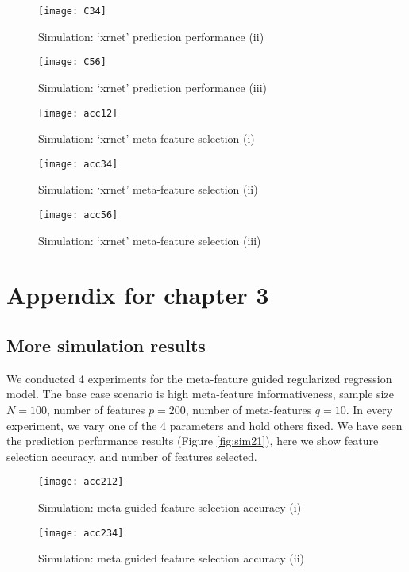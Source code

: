 \begin{figure}[H]
    \texttt{[image: C34]}
    \caption{Simulation: `xrnet' prediction performance (ii)}
    \label{fig:C34}
\end{figure} 

\begin{figure}[H]
    \texttt{[image: C56]}
    \caption{Simulation: `xrnet' prediction performance (iii)}
    \label{fig:C56}
\end{figure} 

\begin{figure}[H]
    \texttt{[image: acc12]}
    \caption{Simulation: `xrnet' meta-feature selection (i)}
    \label{fig:acc12}
\end{figure} 

\begin{figure}[H]
    \texttt{[image: acc34]}
    \caption{Simulation: `xrnet' meta-feature selection (ii)}
    \label{fig:acc34}
\end{figure} 

\begin{figure}[H]
    \texttt{[image: acc56]}
    \caption{Simulation: `xrnet' meta-feature selection (iii)}
    \label{fig:acc56}
\end{figure} 

\section{Appendix for chapter 3}
\subsection{More simulation results}
We conducted 4 experiments for the meta-feature guided regularized regression model. The base case scenario is high meta-feature informativeness, sample size $N=100$, number of features $p=200$, number of meta-features $q=10$. In every experiment, we vary one of the 4 parameters and hold others fixed. We have seen the prediction performance results (Figure \ref{fig:sim21}), here we show feature selection accuracy, and number of features selected.

\begin{figure}[H]
    \texttt{[image: acc212]}
    \caption{Simulation: meta guided feature selection accuracy (i)}
    \label{fig:acc212}
\end{figure} 

\begin{figure}[H]
    \texttt{[image: acc234]}
    \caption{Simulation: meta guided feature selection accuracy (ii)}
    \label{fig:acc234}
\end{figure} 

